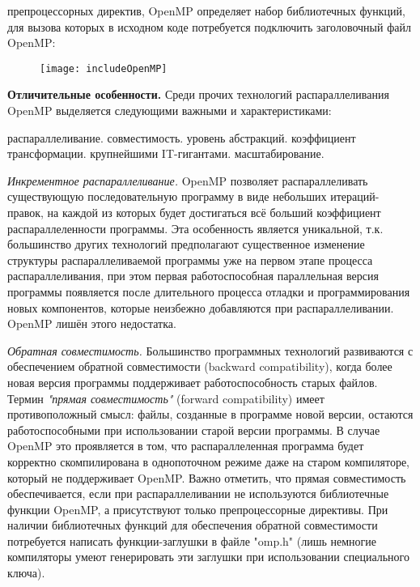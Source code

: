 {\begin{table}[H]
\begin{center}
		\end{center}
	\end{table}
	 препроцессорных директив, OpenMP определяет набор библиотечных функций, для вызова которых в исходном коде потребуется подключить заголовочный файл OpenMP:
	\begin{figure}[H]
		\texttt{[image: includeOpenMP]}
	\end{figure}
	\par\textbf{Отличительные особенности.} Среди прочих технологий распараллеливания OpenMP выделяется следующими важными и характеристиками:
	\begin{itemize}
		 распараллеливание.
		 совместимость.
		 уровень абстракций.
		 коэффициент трансформации.
		 крупнейшими  IT-гигантами. 
		 масштабирование.
	\end{itemize}
	\par\textit{Инкрементное распараллеливание.}  OpenMP позволяет распараллеливать существующую последовательную программу в виде  небольших итераций-правок, на каждой из которых будет достигаться всё больший коэффициент распараллеленности программы. Эта особенность является уникальной, т.к. большинство других технологий предполагают существенное изменение структуры распараллеливаемой программы уже на первом этапе процесса распараллеливания, при этом первая работоспособная параллельная версия программы появляется после длительного процесса отладки и программирования новых компонентов, которые неизбежно добавляются при распараллеливании. OpenMP лишён этого недостатка.
	\par\textit{Обратная совместимость.} Большинство программных технологий развиваются с обеспечением обратной совместимости (backward compatibility), когда более новая версия программы поддерживает работоспособность старых файлов. Термин \textit{"прямая совместимость"} (forward compatibility) имеет противоположный смысл: файлы, созданные в программе новой версии, остаются работоспособными при использовании старой версии программы. В случае OpenMP это проявляется в том, что распараллеленная программа будет корректно скомпилирована в однопоточном режиме даже на старом компиляторе, который не поддерживает OpenMP. Важно отметить, что прямая совместимость обеспечивается, если при распараллеливании не используются библиотечные функции OpenMP, а присутствуют только препроцессорные директивы. При наличии библиотечных функций для обеспечения обратной совместимости потребуется написать функции-заглушки в файле "omp.h" (лишь немногие компиляторы умеют генерировать эти заглушки при использовании специального ключа).
}

